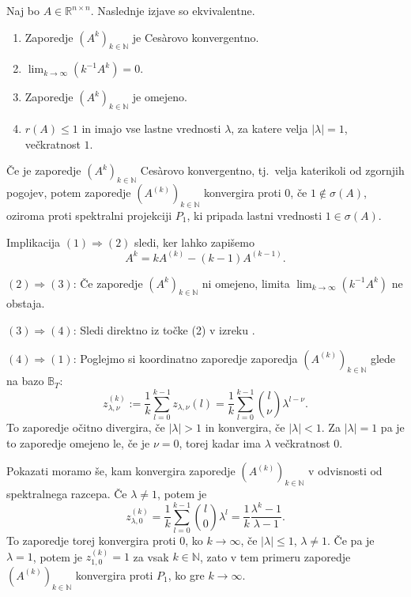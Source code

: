 \documentclass[mat1]{fmfdelo}
\newcommand{\R}{\mathbb R}
\newcommand{\N}{\mathbb N}
\begin{document}
\begin{izrek}\label{izrekCesaro}
    Naj bo $A \in \R^{n \times n}$. Naslednje izjave so ekvivalentne.
    \begin{enumerate}
        \item Zaporedje $(A^k)_{k\in\N}$ je Ces\`arovo konvergentno.
        \item $\lim_{k\rightarrow \infty} \left(k^{-1}A^k\right) = 0$.
        \item Zaporedje $(A^k)_{k\in\N}$ je omejeno.
        \item $r(A) \leq 1$ in imajo vse lastne vrednosti $\lambda$, za katere velja $|\lambda| = 1$, večkratnost $1$.
    \end{enumerate}
    Če je zaporedje $(A^k)_{k\in\N}$ Ces\`arovo konvergentno, tj.\ velja katerikoli od zgornjih pogojev, potem zaporedje $(A^{(k)})_{k\in\N}$ konvergira proti $0$, če $1 \notin \sigma(A)$, oziroma proti spektralni projekciji $P_1$, ki pripada lastni vrednosti $1\in\sigma(A)$.
\end{izrek}
\begin{dokaz}
    Implikacija $(1) \Rightarrow (2)$ sledi, ker lahko zapišemo
    \begin{equation*}
        A^k = k A^{(k)} - (k-1) A^{(k-1)}.
    \end{equation*}

    \noindent $(2) \Rightarrow (3)$: Če zaporedje $(A^k)_{k\in\N}$ ni omejeno, limita $\lim_{k\rightarrow \infty} (k^{-1}A^k)$ ne obstaja.
    
    \noindent $(3) \Rightarrow (4)$: Sledi direktno iz točke (2) v izreku .
    
    \noindent $(4) \Rightarrow (1)$: Poglejmo si koordinatno zaporedje zaporedja $(A^{(k)})_{k\in\N}$ glede na bazo $\mathbb{B}_T$:
    \begin{equation*}
        z_{\lambda, \nu}^{(k)} := \frac{1}{k} \sum_{l=0}^{k-1} z_{\lambda, \nu} (l) = \frac{1}{k} \sum_{l=0}^{k-1}{l \choose \nu} \lambda^{l - \nu}.
    \end{equation*}
    To zaporedje očitno divergira, če $|\lambda| > 1$ in konvergira, če $|\lambda| < 1$. Za $|\lambda| = 1$ pa je to zaporedje omejeno le, če je $\nu = 0$, torej kadar ima $\lambda$ večkratnost $0$.

    \noindent Pokazati moramo še, kam konvergira zaporedje $(A^{(k)})_{k\in\N}$ v odvisnosti od spektralnega razcepa. Če $\lambda \neq 1$, potem je
    \begin{equation*}
        z_{\lambda, 0}^{(k)} = \frac{1}{k} \sum_{l=0}^{k-1}{l \choose 0} \lambda^{l} = \frac{1}{k}\frac{\lambda^k-1}{\lambda-1}.
    \end{equation*}
    To zaporedje torej konvergira proti $0$, ko $k\rightarrow\infty$, če $|\lambda|\leq 1$, $\lambda \neq 1$. Če pa je $\lambda = 1$, potem je $z_{1, 0}^{(k)} = 1$ za vsak $k \in \N$, zato v tem primeru zaporedje $(A^{(k)})_{k\in\N}$ konvergira proti $P_1$, ko gre $k\rightarrow\infty$.

\end{dokaz}
\end{document}
